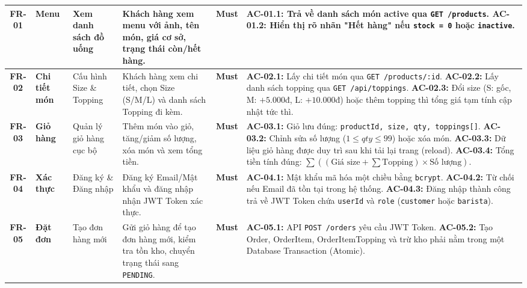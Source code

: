 \documentclass[12pt,a4paper]{article}
\begin{document}
\begin{xltabular}{\textwidth}{|c|>{\raggedright\arraybackslash}p{1.8cm}|>{\raggedright\arraybackslash}p{2.6cm}|>{\raggedright\arraybackslash}p{3cm}|c|>{\raggedright\arraybackslash}X|}
\textbf{FR-01} & \textbf{Menu} & Xem danh sách đồ uống & Khách hàng xem menu với ảnh, tên món, giá cơ sở, trạng thái còn/hết hàng. & \textbf{Must} & 
\textbf{AC-01.1:} Trả về danh sách món active qua \texttt{GET /products}.\newline
\textbf{AC-01.2:} Hiển thị rõ nhãn "Hết hàng" nếu \texttt{stock = 0} hoặc \texttt{inactive}. \\
\hline
\textbf{FR-02} & \textbf{Chi tiết món} & Cấu hình Size \& Topping & Khách hàng xem chi tiết, chọn Size (S/M/L) và danh sách Topping đi kèm. & \textbf{Must} & 
\textbf{AC-02.1:} Lấy chi tiết món qua \texttt{GET /products/:id}.\newline
\textbf{AC-02.2:} Lấy danh sách topping qua \texttt{GET /api/toppings}.\newline
\textbf{AC-02.3:} Đổi size (S: gốc, M: $+5.000$đ, L: $+10.000$đ) hoặc thêm topping thì tổng giá tạm tính cập nhật tức thì. \\
\hline
\textbf{FR-03} & \textbf{Giỏ hàng} & Quản lý giỏ hàng cục bộ & Thêm món vào giỏ, tăng/giảm số lượng, xóa món và xem tổng tiền. & \textbf{Must} & 
\textbf{AC-03.1:} Giỏ lưu đúng: \texttt{productId, size, qty, toppings[]}.\newline
\textbf{AC-03.2:} Chỉnh sửa số lượng ($1 \le qty \le 99$) hoặc xóa món.\newline
\textbf{AC-03.3:} Dữ liệu giỏ hàng được duy trì sau khi tải lại trang (reload).\newline
\textbf{AC-03.4:} Tổng tiền tính đúng: $\sum ((\text{Giá size} + \sum \text{Topping}) \times \text{Số lượng})$. \\
\hline
\textbf{FR-04} & \textbf{Xác thực} & Đăng ký \& Đăng nhập & Đăng ký Email/Mật khẩu và đăng nhập nhận JWT Token xác thực. & \textbf{Must} & 
\textbf{AC-04.1:} Mật khẩu mã hóa một chiều bằng \texttt{bcrypt}.\newline
\textbf{AC-04.2:} Từ chối nếu Email đã tồn tại trong hệ thống.\newline
\textbf{AC-04.3:} Đăng nhập thành công trả về JWT Token chứa \texttt{userId} và \texttt{role} (\texttt{customer} hoặc \texttt{barista}). \\
\hline
\textbf{FR-05} & \textbf{Đặt đơn} & Tạo đơn hàng mới & Gửi giỏ hàng để tạo đơn hàng mới, kiểm tra tồn kho, chuyển trạng thái sang \texttt{PENDING}. & \textbf{Must} & 
\textbf{AC-05.1:} API \texttt{POST /orders} yêu cầu JWT Token.\newline
\textbf{AC-05.2:} Tạo Order, OrderItem, OrderItemTopping và trừ kho phải nằm trong một Database Transaction (Atomic).\newline

\end{xltabular}
\end{document}
